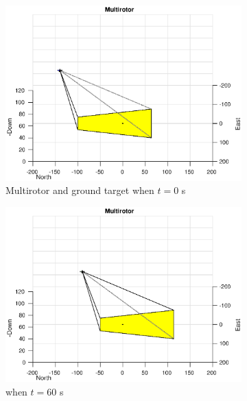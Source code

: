 \begin{figure}[htbp]
	\centering
	\begin{subfigure}[t]{0.45\linewidth}
		\includegraphics[width=\textwidth]{images/chapter4/image_UAV_0mps}
		\caption{Multirotor and ground target when $t=0$ s}
	\end{subfigure}
	\begin{subfigure}[t]{0.45\linewidth}
		\includegraphics[width=\textwidth]{images/chapter4/image_UAV_0mps_60s}
		\caption{when $t=60$ s}
	\end{subfigure}
	\begin{subfigure}[t]{0.45\linewidth}

\end{subfigure}
\end{figure}
